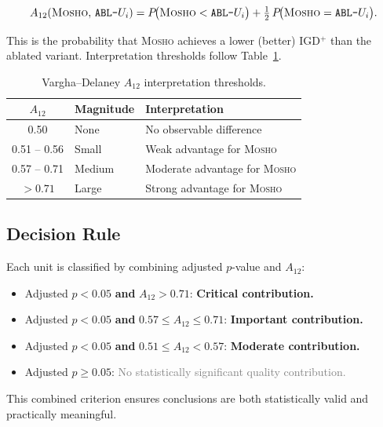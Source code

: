 \documentclass[11pt,a4paper]{article}
\newcommand{\mosho}{\textsc{Mosho}}
\newcommand{\ablof}[1]{\texttt{ABL-#1}}
\newcommand{\critical}[1]{\textbf{\textcolor{critred}{#1}}}
\newcommand{\important}[1]{\textbf{\textcolor{imptorange}{#1}}}
\newcommand{\secondary}[1]{\textbf{\textcolor{modblue}{#1}}}
\newcommand{\neutral}[1]{\textcolor{gray}{#1}}
\begin{document}
\[
A_{12}(\mosho{},\,\ablof{$U_i$})
=
P\!\bigl(\mosho{} < \ablof{$U_i$}\bigr)
+ \tfrac{1}{2}\,
P\!\bigl(\mosho{} = \ablof{$U_i$}\bigr).
\]

This is the probability that \mosho{} achieves a lower (better) IGD$^+$
than the ablated variant.  Interpretation thresholds follow
Table~\ref{tab:a12_thresholds}.

\begin{table}[H]
\centering
\caption{Vargha--Delaney $A_{12}$ interpretation thresholds.}
\label{tab:a12_thresholds}
\renewcommand{\arraystretch}{1.3}
\small
\begin{tabular}{cll}
\toprule
$A_{12}$ & \textbf{Magnitude} & \textbf{Interpretation} \\
\midrule
0.50           & None   & No observable difference \\
0.51 -- 0.56   & Small  & Weak advantage for \mosho{} \\
0.57 -- 0.71   & Medium & Moderate advantage for \mosho{} \\
$> 0.71$       & Large  & Strong advantage for \mosho{} \\
\bottomrule
\end{tabular}
\end{table}

\subsection{Decision Rule}
\label{sec:stat_decision}

Each unit is classified by combining adjusted $p$-value and $A_{12}$:

\begin{itemize}[leftmargin=2em, itemsep=4pt]
  \item Adjusted $p < 0.05$ \textbf{and} $A_{12} > 0.71$:
        \quad\critical{Critical contribution.}
  \item Adjusted $p < 0.05$ \textbf{and} $0.57 \leq A_{12} \leq 0.71$:
        \quad\important{Important contribution.}
  \item Adjusted $p < 0.05$ \textbf{and} $0.51 \leq A_{12} < 0.57$:
        \quad\secondary{Moderate contribution.}
  \item Adjusted $p \geq 0.05$:
        \quad\neutral{No statistically significant quality contribution.}
\end{itemize}

\noindent This combined criterion ensures conclusions are both
statistically valid and practically meaningful.
\end{document}
